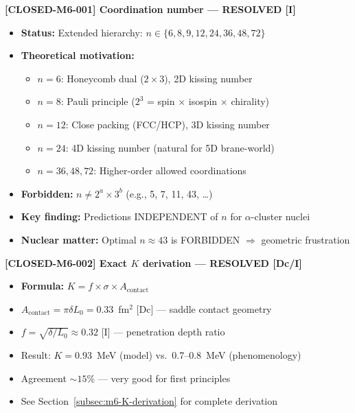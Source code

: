 \begin{tcolorbox}[colback=orange!5!white, colframe=orange!75!black, breakable, title=Open Questions from Topological Pinning Model]

\textbf{[CLOSED-M6-001] Coordination number --- RESOLVED [I]}
\begin{itemize}
    \item \textbf{Status:} Extended hierarchy: $n \in \{6, 8, 9, 12, 24, 36, 48, 72\}$
    \item \textbf{Theoretical motivation:}
    \begin{itemize}
        \item $n=6$: Honeycomb dual ($2 \times 3$), 2D kissing number
        \item $n=8$: Pauli principle ($2^3$ = spin $\times$ isospin $\times$ chirality)
        \item $n=12$: Close packing (FCC/HCP), 3D kissing number
        \item $n=24$: 4D kissing number (natural for 5D brane-world)
        \item $n=36, 48, 72$: Higher-order allowed coordinations
    \end{itemize}
    \item \textbf{Forbidden:} $n \neq 2^a \times 3^b$ (e.g., 5, 7, 11, 43, \ldots)
    \item \textbf{Key finding:} Predictions INDEPENDENT of $n$ for $\alpha$-cluster nuclei
    \item \textbf{Nuclear matter:} Optimal $n \approx 43$ is FORBIDDEN $\Rightarrow$ geometric frustration
\end{itemize}

\textbf{[CLOSED-M6-002] Exact $K$ derivation --- RESOLVED [Dc/I]}
\begin{itemize}
    \item \textbf{Formula:} $K = f \times \sigma \times A_{\text{contact}}$
    \item $A_{\text{contact}} = \pi \delta L_0 = 0.33$~fm$^2$ [Dc] --- saddle contact geometry
    \item $f = \sqrt{\delta/L_0} \approx 0.32$ [I] --- penetration depth ratio
    \item Result: $K = 0.93$~MeV (model) vs.\ 0.7--0.8~MeV (phenomenology)
    \item Agreement $\sim 15\%$ --- very good for first principles
    \item See Section~\ref{subsec:m6-K-derivation} for complete derivation
\end{itemize}


\end{tcolorbox}
